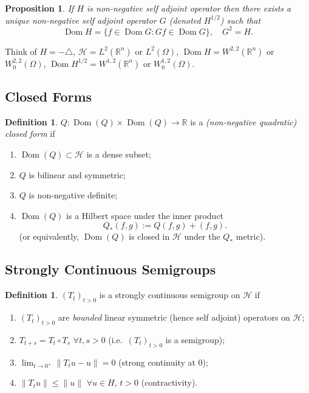 \documentclass[a4paper]{amsart}
\theoremstyle{plain}
\newtheorem{proposition}[theorem]{Proposition}
\theoremstyle{definition}
\newtheorem{definition}[theorem]{Definition}%
\theoremstyle{remark}
\DeclareMathOperator{\dom}{Dom}
\begin{document}
\begin{proposition} If $ H $ is non-negative self adjoint operator then there exists a unique non-negative self adjoint operator $ G $ (denoted $ H^{1/2} $) such that 
 \[
 \dom H = \{ f \in \dom G : G f \in \dom G \}, \quad G^2 = H .
 \]
 \end{proposition} 
 
 Think of $ H = -\triangle $,  $\mathcal{H} =  L^2(\mathbb{R}^n ) $ or $ L^2(\Omega) $,  $ \dom H = W^{2,2}(\mathbb{R}^n )$ or $ W^{2,2}_0(\Omega) $, $ \dom H^{1/2} = W^{1,2}(\mathbb{R}^n )$ or $ W_0^{1,2}(\Omega) $.
 
\subsection{Closed Forms} 
\begin{definition}\label{dcf}
$ Q : \dom (Q) \times \dom (Q) \to \mathbb{R} $ is a \emph{(non-negative quadratic) closed  form} if 
\begin{enumerate}

\item $ \dom (Q) \subset \mathcal{H} $ is a dense subset;
\item $ Q $ is bilinear and symmetric;
\item $   Q $ is non-negative definite;
\item $\dom (Q) $ is a Hilbert space under the inner product
\[  Q_*(f,g) := Q(f,g) + (f,g) . \]
 (or equivalently, $\dom (Q)  $ is closed in $ \mathcal{H} $ under the $ Q_* $ metric).
 \end{enumerate} 
\end{definition} 

\subsection{Strongly Continuous Semigroups} 

\begin{definition}
$   (T_t)_{t>0} $ is a strongly continuous semigroup on $ \mathcal{H}$ if
\begin{enumerate}

\item $ (T_t)_{t>0} $ are \emph{bounded} linear symmetric (hence self adjoint) operators on $ \mathcal{H} $;
\item $ T_{t+s} = T_t\circ  T_s $ $ \forall t,s > 0 $ (i.e.\ $ (T_t)_{t>0} $ is a semigroup);
\item $ \lim_{t\to 0^+} \|T_tu -u\| = 0$ (strong continuity at $ 0 $);
\item $ \|T_tu\| \leq \|u\| $  $ \forall u \in H $, $ t>0 $ (contractivity).
\end{enumerate} 
\end{definition} 
\end{document}
